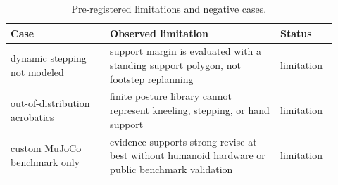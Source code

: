 \begin{table}[t]
\centering
\caption{Pre-registered limitations and negative cases.}
\label{tab:negative-cases}
\small
\begin{tabular}{p{0.28\linewidth}p{0.48\linewidth}p{0.16\linewidth}}
\toprule
Case & Observed limitation & Status \\
\midrule
dynamic stepping not modeled & support margin is evaluated with a standing support polygon, not footstep replanning & limitation \\
out-of-distribution acrobatics & finite posture library cannot represent kneeling, stepping, or hand support & limitation \\
custom MuJoCo benchmark only & evidence supports strong-revise at best without humanoid hardware or public benchmark validation & limitation \\
\bottomrule
\end{tabular}
\end{table}
